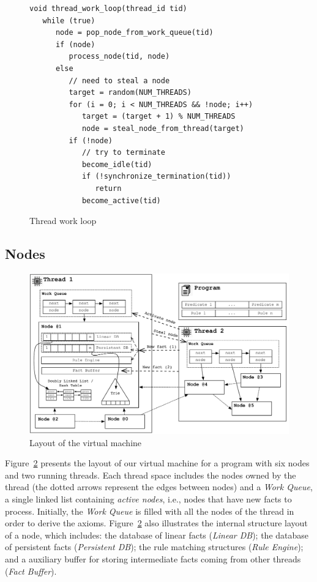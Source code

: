 \begin{figure}[ht]
{\footnotesize
\begin{Verbatim}
void thread_work_loop(thread_id tid)
   while (true)
      node = pop_node_from_work_queue(tid)
      if (node)
         process_node(tid, node)
      else
         // need to steal a node
         target = random(NUM_THREADS)
         for (i = 0; i < NUM_THREADS && !node; i++)
            target = (target + 1) % NUM_THREADS
            node = steal_node_from_thread(target)
         if (!node)
            // try to terminate
            become_idle(tid)
            if (!synchronize_termination(tid))
               return
            become_active(tid)
\end{Verbatim}
}
\caption{Thread work loop}
\label{code:work_loop}
\end{figure}


\subsection{Nodes}

\begin{figure}[t]
\centering
\includegraphics[width=\textwidth]{figures/overview.pdf}
\caption{Layout of the virtual machine}
\label{fig:overview}
\end{figure}

Figure~\ref{fig:overview} presents the layout of our virtual machine
for a program with six nodes and two running threads. Each thread
space includes the nodes owned by the thread (the dotted arrows
represent the edges between nodes) and a \emph{Work Queue}, a single
linked list containing \emph{active nodes}, i.e., nodes that have new
facts to process. Initially, the \emph{Work Queue} is filled with all
the nodes of the thread in order to derive the
axioms. Figure~\ref{fig:overview} also illustrates the internal
structure layout of a node, which includes: the database of linear
facts (\emph{Linear DB}); the database of persistent facts
(\emph{Persistent DB}); the rule matching structures (\emph{Rule
Engine}); and a auxiliary buffer for storing intermediate facts
coming from other threads (\emph{Fact Buffer}).

